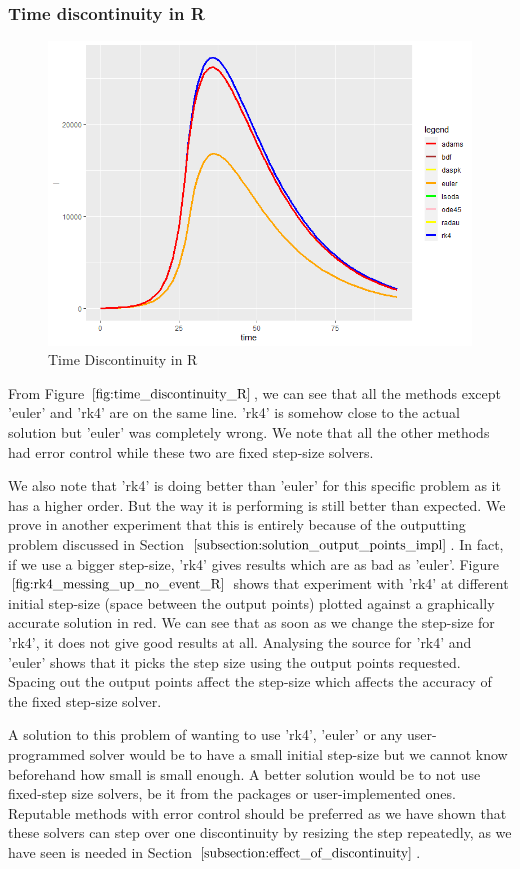 \subsubsection{Time discontinuity in R}
\begin{figure}[h]
	\centering
	\includegraphics[width=0.7\linewidth]{./figures/time_discontinuity_R}
	\caption{Time Discontinuity in R}
	\label{fig:time_discontinuity_R}
\end{figure}
From Figure $\ref{fig:time_discontinuity_R}$, we can see that all the methods except 'euler' and 'rk4' are on the same line. 'rk4' is somehow close to the actual solution but 'euler' was completely wrong. We note that all the other methods had error control while these two are fixed step-size solvers.

We also note that 'rk4' is doing better than 'euler' for this specific problem as it has a higher order. But the way it is performing is still better than expected. We prove in another experiment that this is entirely because of the outputting problem discussed in Section $\ref{subsection:solution_output_points_impl}$. In fact, if we use a bigger step-size, 'rk4' gives results which are as bad as 'euler'. Figure $\ref{fig:rk4_messing_up_no_event_R}$ shows that experiment with 'rk4' at different initial step-size (space between the output points) plotted against a graphically accurate solution in red. We can see that as soon as we change the step-size for 'rk4', it does not give good results at all. Analysing the source for 'rk4' and 'euler' shows that it picks the step size using the output points requested. Spacing out the output points affect the step-size which affects the accuracy of the fixed step-size solver.

A solution to this problem of wanting to use 'rk4', 'euler' or any user-programmed solver would be to have a small initial step-size but we cannot know beforehand how small is small enough. A better solution would be to not use fixed-step size solvers, be it from the packages or user-implemented ones. Reputable methods with error control should be preferred as we have shown that these solvers can step over one discontinuity by resizing the step repeatedly, as we have seen is needed in Section $\ref{subsection:effect_of_discontinuity}$.


